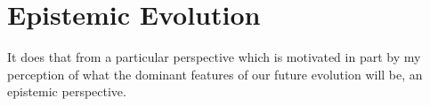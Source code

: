\chapter{Epistemic Evolution}\label{EpistemicEvolution}


It does that from a particular perspective which is motivated in part by my perception of what the dominant features of our future evolution will be, an epistemic perspective.

